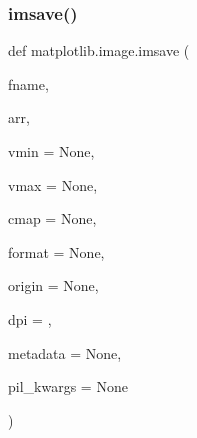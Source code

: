 \subsubsection{\texorpdfstring{imsave()}{imsave()}}
{\footnotesize\ttfamily def matplotlib.\+image.\+imsave (\begin{DoxyParamCaption}\item[{}]{fname,  }\item[{}]{arr,  }\item[{}]{vmin = {\ttfamily None},  }\item[{}]{vmax = {\ttfamily None},  }\item[{}]{cmap = {\ttfamily None},  }\item[{}]{format = {\ttfamily None},  }\item[{}]{origin = {\ttfamily None},  }\item[{}]{dpi = {},  }\item[{}]{metadata = {\ttfamily None},  }\item[{}]{pil\+\_\+kwargs = {\ttfamily None} }\end{DoxyParamCaption})}

